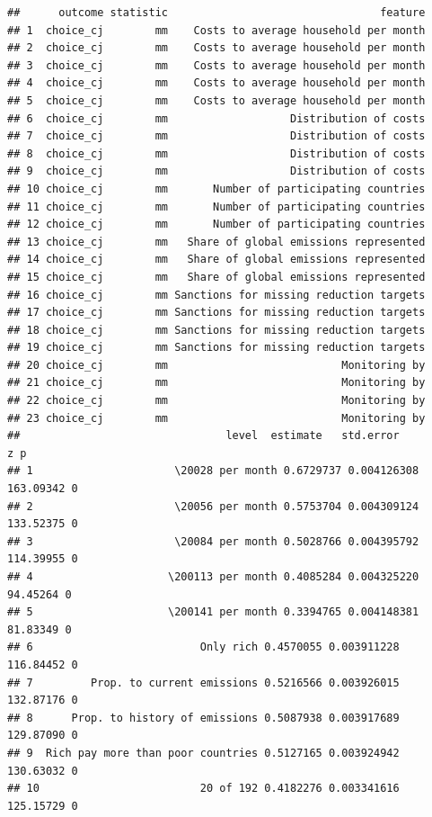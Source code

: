 \documentclass[a4paper,12pt]{article}\usepackage[]{graphicx}\usepackage[]{color}
\makeatletter
\newenvironment{kframe}{%
 \def\at@end@of@kframe{}%
 \ifinner\ifhmode%
  \def\at@end@of@kframe{\end{minipage}}%
  \begin{minipage}{\columnwidth}%
 \fi\fi%
 \def\FrameCommand##1{\hskip\@totalleftmargin \hskip-\fboxsep
 \colorbox{shadecolor}{##1}\hskip-\fboxsep
     \hskip-\linewidth \hskip-\@totalleftmargin \hskip\columnwidth}%
 \MakeFramed {\advance\hsize-\width
   \@totalleftmargin\z@ \linewidth\hsize
   \@setminipage}}%
 {\par\unskip\endMakeFramed%
 \at@end@of@kframe}
\newenvironment{knitrout}{}{} %
\makeatother
\begin{document}
\begin{knitrout}
\color{fgcolor}\begin{kframe}
\begin{verbatim}
##      outcome statistic                                 feature
## 1  choice_cj        mm    Costs to average household per month
## 2  choice_cj        mm    Costs to average household per month
## 3  choice_cj        mm    Costs to average household per month
## 4  choice_cj        mm    Costs to average household per month
## 5  choice_cj        mm    Costs to average household per month
## 6  choice_cj        mm                   Distribution of costs
## 7  choice_cj        mm                   Distribution of costs
## 8  choice_cj        mm                   Distribution of costs
## 9  choice_cj        mm                   Distribution of costs
## 10 choice_cj        mm       Number of participating countries
## 11 choice_cj        mm       Number of participating countries
## 12 choice_cj        mm       Number of participating countries
## 13 choice_cj        mm   Share of global emissions represented
## 14 choice_cj        mm   Share of global emissions represented
## 15 choice_cj        mm   Share of global emissions represented
## 16 choice_cj        mm Sanctions for missing reduction targets
## 17 choice_cj        mm Sanctions for missing reduction targets
## 18 choice_cj        mm Sanctions for missing reduction targets
## 19 choice_cj        mm Sanctions for missing reduction targets
## 20 choice_cj        mm                           Monitoring by
## 21 choice_cj        mm                           Monitoring by
## 22 choice_cj        mm                           Monitoring by
## 23 choice_cj        mm                           Monitoring by
##                                level  estimate   std.error         z p
## 1                      \20028 per month 0.6729737 0.004126308 163.09342 0
## 2                      \20056 per month 0.5753704 0.004309124 133.52375 0
## 3                      \20084 per month 0.5028766 0.004395792 114.39955 0
## 4                     \200113 per month 0.4085284 0.004325220  94.45264 0
## 5                     \200141 per month 0.3394765 0.004148381  81.83349 0
## 6                          Only rich 0.4570055 0.003911228 116.84452 0
## 7         Prop. to current emissions 0.5216566 0.003926015 132.87176 0
## 8      Prop. to history of emissions 0.5087938 0.003917689 129.87090 0
## 9  Rich pay more than poor countries 0.5127165 0.003924942 130.63032 0
## 10                         20 of 192 0.4182276 0.003341616 125.15729 0

\end{verbatim}
\end{kframe}
\end{knitrout}
\end{document}
